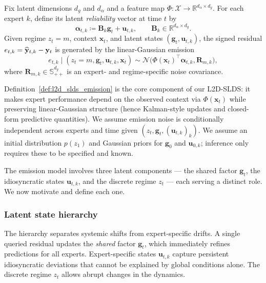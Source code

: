 \begin{definition}
\label{def:l2d_slds_emission}
	Fix latent dimensions \(d_g\) and \(d_\alpha\) and a feature map
	\(\Phi:\mathcal{X}\to\mathbb{R}^{d_\alpha\times d_y}\).
	For each expert \(k\), define its latent \emph{reliability} vector at time \(t\) by
	\begin{equation}
	\label{eq:alpha_def}
	\boldsymbol\alpha_{t,k}\coloneqq \mathbf{B}_k\mathbf{g}_t+\mathbf{u}_{t,k},
	\qquad
	\mathbf{B}_k\in\mathbb{R}^{d_\alpha\times d_g}.
	\end{equation}
	Given regime \(z_t=m\), context \(\mathbf{x}_t\), and latent states \((\mathbf{g}_t,\mathbf{u}_{t,k})\),
	the signed residual \(e_{t,k}=\widehat{\mathbf{y}}_{t,k}-\mathbf{y}_t\) is generated by the linear-Gaussian emission
	\begin{equation*}
	\label{eq:residual_emission}
	e_{t,k}\mid (z_t=m,\mathbf{g}_t,\mathbf{u}_{t,k},\mathbf{x}_t)
	\sim
	\mathcal{N}\big(\Phi(\mathbf{x}_t)^\top\boldsymbol\alpha_{t,k},\mathbf{R}_{m,k}\big),
	\end{equation*}
	where \(\mathbf{R}_{m,k}\in\mathbb{S}^{d_y}_{++}\) is an expert- and regime-specific noise covariance.
\end{definition}

Definition~\ref{def:l2d_slds_emission} is the core component of our L2D-SLDS: it
makes expert performance depend on the observed context via \(\Phi(\mathbf{x}_t)\) while preserving
linear-Gaussian structure (hence Kalman-style updates and closed-form predictive quantities). We
assume emission noise is conditionally independent across experts and time given
\((z_t,\mathbf{g}_t,(\mathbf{u}_{t,k})_k)\). We assume an initial distribution \(p(z_1)\) and Gaussian priors for \(\mathbf{g}_0\) and
\(\mathbf{u}_{0,k}\); inference only requires these to be specified and known.

The emission model involves three latent components --- the shared factor \(\mathbf{g}_t\), the
idiosyncratic states \(\mathbf{u}_{t,k}\), and the discrete regime \(z_t\) --- each serving a distinct
role. We now motivate and define each one.

\subsubsection{Latent state hierarchy}
The hierarchy separates systemic shifts from expert-specific drifts.
A single queried residual updates the \emph{shared} factor
\(\mathbf{g}_t\), which immediately refines predictions for all experts. Expert-specific states
\(\mathbf{u}_{t,k}\) capture persistent idiosyncratic deviations that cannot be explained by global
conditions alone. The discrete regime \(z_t\) allows abrupt changes in the dynamics.

